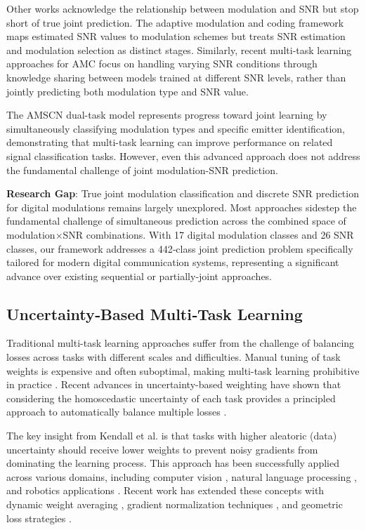 \documentclass{ELSP}
\begin{document}
Other works acknowledge the relationship between modulation and SNR but stop short of true joint prediction. The adaptive modulation and coding framework \cite{adaptivemc2019} maps estimated SNR values to modulation schemes but treats SNR estimation and modulation selection as distinct stages. Similarly, recent multi-task learning approaches for AMC \cite{multitaskgen2021} focus on handling varying SNR conditions through knowledge sharing between models trained at different SNR levels, rather than jointly predicting both modulation type and SNR value.

The AMSCN dual-task model \cite{amscn2023} represents progress toward joint learning by simultaneously classifying modulation types and specific emitter identification, demonstrating that multi-task learning can improve performance on related signal classification tasks. However, even this advanced approach does not address the fundamental challenge of joint modulation-SNR prediction.

\textbf{Research Gap}: True joint modulation classification and discrete SNR prediction for digital modulations remains largely unexplored. Most approaches sidestep the fundamental challenge of simultaneous prediction across the combined space of modulation×SNR combinations. With 17 digital modulation classes and 26 SNR classes, our framework addresses a 442‑class joint prediction problem specifically tailored for modern digital communication systems, representing a significant advance over existing sequential or partially-joint approaches.

\subsection{Uncertainty‑Based Multi‑Task Learning}
Traditional multi-task learning approaches suffer from the challenge of balancing losses across tasks with different scales and difficulties. Manual tuning of task weights is expensive and often suboptimal, making multi-task learning prohibitive in practice \cite{kendall2018multi}. Recent advances in uncertainty-based weighting have shown that considering the homoscedastic uncertainty of each task provides a principled approach to automatically balance multiple losses \cite{kendall2018multi}.

The key insight from Kendall et al. \cite{kendall2018multi} is that tasks with higher aleatoric (data) uncertainty should receive lower weights to prevent noisy gradients from dominating the learning process. This approach has been successfully applied across various domains, including computer vision \cite{liebel2018auxiliary}, natural language processing \cite{liu2019end}, and robotics applications \cite{chen2018gradnorm}. Recent work has extended these concepts with dynamic weight averaging \cite{liu2019end}, gradient normalization techniques \cite{chen2018gradnorm}, and geometric loss strategies \cite{chennupati2019multinet}.
\end{document}
